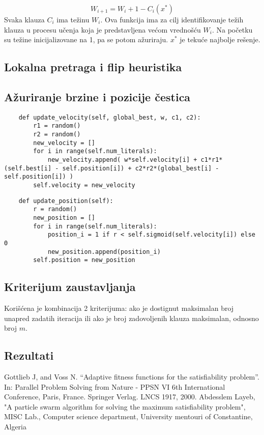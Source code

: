 \documentclass{article}
\begin{document}
$$ W_{i+1} = W_{i} + 1 - C_i(x^*) $$
Svaka klauza $C_i$ ima težinu $W_i$. Ova funkcija ima za cilj identifikovanje težih klauza u procesu učenja koja je predstavljena većom vrednošću $W_i$. Na početku su težine inicijalizovane na 1, pa se potom ažuriraju.
$x^*$ je tekuće najbolje rešenje.


\subsection{Lokalna pretraga i flip heuristika}
 
\subsection{Ažuriranje brzine i pozicije čestica}
\begin{lstlisting}
    def update_velocity(self, global_best, w, c1, c2):
        r1 = random()
        r2 = random()
        new_velocity = []
        for i in range(self.num_literals):
            new_velocity.append( w*self.velocity[i] + c1*r1*(self.best[i] - self.position[i]) + c2*r2*(global_best[i] - self.position[i]) )
        self.velocity = new_velocity
\end{lstlisting}

\begin{lstlisting}
    def update_position(self):
        r = random()
        new_position = []
        for i in range(self.num_literals):
            position_i = 1 if r < self.sigmoid(self.velocity[i]) else 0
            new_position.append(position_i)
        self.position = new_position
\end{lstlisting}

\subsection{Kriterijum zaustavljanja}
Korišćena je kombinacija 2 kriterijuma: ako je dostignut maksimalan broj unapred zadatih iteracija ili ako je broj zadovoljenih klauza maksimalan, odnosno broj $m$.

\subsection{Rezultati}


\newpage
\begin{thebibliography}{9}
\bibitem{} Gottlieb J, and Voss N. “Adaptive fitness functions for the satisfiability problem”. In: Parallel Problem Solving from Nature - PPSN VI 6th International Conference, Paris, France. Springer Verlag. LNCS 1917, 2000.
\bibitem{} Abdesslem Layeb, "A particle swarm algorithm for solving the maximum satisfiability problem", MISC Lab., Computer science department, University mentouri of Constantine, Algeria
\end{thebibliography}
\end{document}
